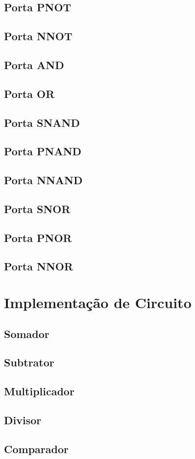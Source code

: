 \documentclass[12pt]{article}
\begin{document}
\subsection{Porta PNOT}

\subsection{Porta NNOT}

\subsection{Porta AND}

\subsection{Porta OR}

\subsection{Porta SNAND}

\subsection{Porta PNAND}

\subsection{Porta NNAND}

\subsection{Porta SNOR}

\subsection{Porta PNOR}

\subsection{Porta NNOR}

\section{Implementação de Circuito }

\subsection{Somador}

\subsection{Subtrator}

\subsection{Multiplicador}

\subsection{Divisor}

\subsection{Comparador}


\end{document}
